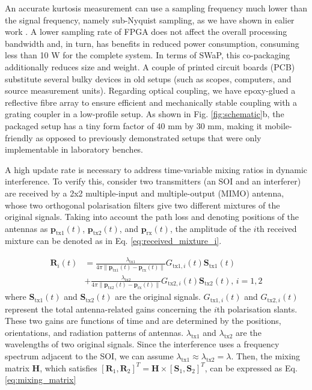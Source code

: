 \documentclass[pdflatex,mathphys]{sty}%
\begin{document}
An accurate kurtosis measurement can use a sampling frequency much lower than the signal frequency, namely sub-Nyquist sampling, as we have shown in ealier work \cite{ma2020photonic, tait2018blind}. A lower sampling rate of FPGA does not affect the overall processing bandwidth and, in turn, has benefits in reduced power consumption, consuming less than 10 W for the complete system. In terms of SWaP, this co-packaging additionally reduces size and weight. A couple of printed circuit boards (PCB) substitute several bulky devices in old setups (such as scopes, computers, and source measurement units). Regarding optical coupling, we have epoxy-glued a reflective fibre array to ensure efficient and mechanically stable coupling with a grating coupler in a low-profile setup. As shown in Fig. \ref{fig:schematic}b, the packaged setup has a tiny form factor of 40 mm by 30 mm, making it mobile-friendly as opposed to previously demonstrated setups that were only implementable in laboratory benches.

A high update rate is necessary to address time-variable mixing ratios in dynamic interference. To verify this, consider two transmitters (an SOI and an interferer) are received by a 2x2 multiple-input and multiple-output (MIMO) antenna, whose two orthogonal polarisation filters give two different mixtures of the original signals. Taking into account the path loss and denoting positions of the antennas as $\textbf{p}_{\textrm{tx1}}(t)$, $\textbf{p}_{\textrm{tx2}}(t)$, and $\textbf{p}_{\textrm{rx}}(t)$, the amplitude of the $i$th received mixture can be denoted as in Eq. \ref{eq:received_mixture_i}.

\begin{equation}
\begin{aligned}
	\textbf{R}_i(t) &= \frac{\lambda_{\textrm{tx1}}}{4\pi \|\textbf{p}_{\textrm{tx1}}(t)-\textbf{p}_{\textrm{rx}}(t)\| }G_{\textrm{tx1},i}(t)\textbf{S}_{\textrm{tx1}}(t)\\
     &+\frac{\lambda_{\textrm{tx2}}}{4\pi \|\textbf{p}_{\textrm{tx2}}(t)-\textbf{p}_{\textrm{rx}}(t)\|}G_{\textrm{tx2},i}(t)\textbf{S}_{\textrm{tx2}}(t),\,i=1,2
\end{aligned}
\label{eq:received_mixture_i}
\end{equation}
where $\textbf{S}_{\textrm{tx1}}(t)$ and $\textbf{S}_{\textrm{tx2}}(t)$ are the original signals. $G_{\textrm{tx1},i}(t)$ and $G_{\textrm{tx2},i}(t)$ represent the total antenna-related gains concerning the $i$th polarisation slants. These two gains are functions of time and are determined by the positions, orientations, and radiation patterns of antennas. $\lambda_{\textrm{tx1}}$ and $\lambda_{\textrm{tx2}}$ are the wavelengths of two original signals. Since the interference uses a frequency spectrum adjacent to the SOI, we can assume $\lambda_{\textrm{tx1}} \approx \lambda_{\textrm{tx2}} = \lambda$. Then, the mixing matrix $\textbf{H}$, which satisfies $[\textbf{R}_1,\textbf{R}_2]^T = \textbf{H}\times[\textbf{S}_1,\textbf{S}_2]^T$, can be expressed as Eq. \ref{eq:mixing_matrix}
\end{document}
